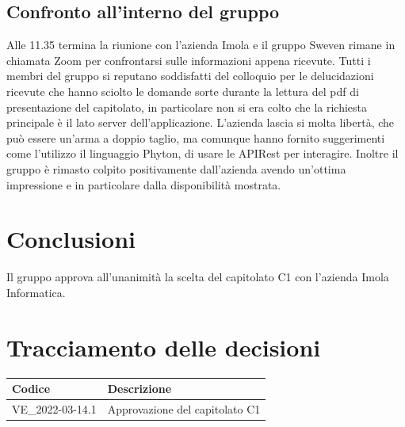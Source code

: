 \documentclass[12pt, a4paper,table]{article}
\begin{document}
		\subsection{Confronto all'interno del gruppo}
		Alle 11.35 termina la riunione con l'azienda Imola e il gruppo Sweven rimane in chiamata Zoom
		per confrontarsi sulle informazioni appena ricevute. \newline
		Tutti i membri del gruppo si reputano soddisfatti del colloquio per le delucidazioni ricevute 
		che hanno sciolto le domande sorte durante la lettura del pdf di presentazione del capitolato,
		in particolare non si era colto che la richiesta principale è il lato server dell'applicazione.
		L'azienda lascia si molta libertà, che può essere un'arma a doppio taglio, ma comunque hanno 
		fornito suggerimenti come l'utilizzo il linguaggio Phyton, di usare le APIRest per interagire.
		Inoltre il gruppo è rimasto colpito positivamente dall'azienda avendo un'ottima impressione e
		in particolare dalla disponibilità mostrata.
	
		\section{Conclusioni}
	Il gruppo approva all'unanimità la scelta del capitolato C1 con l'azienda Imola Informatica.
	\newpage
	
	\section*{Tracciamento delle decisioni}
	\renewcommand{\arraystretch}{2} %
	\begin{tabular}{ |m{8em}|m{30em}| }
		\hline
		\textbf{Codice} & \textbf{Descrizione} \\
		\hline
		VE\_2022-03-14.1 & Approvazione del capitolato C1 \\
		\hline
	\end{tabular}
\end{document}
